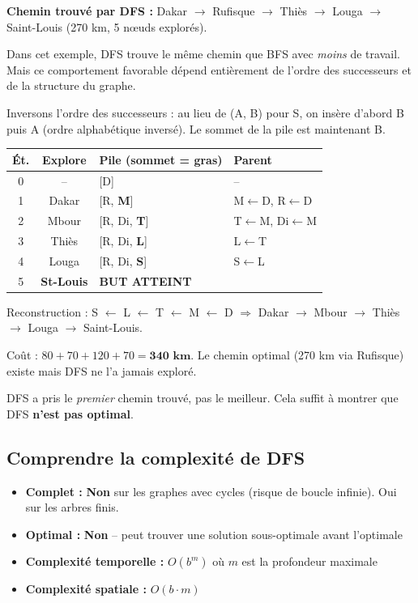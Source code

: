 \documentclass[11pt,a4paper]{article}
\begin{document}
\textbf{Chemin trouvé par DFS :} Dakar $\rightarrow$ Rufisque $\rightarrow$ Thiès $\rightarrow$ Louga $\rightarrow$ Saint-Louis (270 km, 5 nœuds explorés).

Dans cet exemple, DFS trouve le même chemin que BFS avec \textit{moins} de travail. Mais ce comportement favorable dépend entièrement de l'ordre des successeurs et de la structure du graphe.

\begin{exemplebox}
Inversons l'ordre des successeurs : au lieu de (A, B) pour S, on insère d'abord B puis A (ordre alphabétique inversé). Le sommet de la pile est maintenant B.

{\small
\begin{center}
\begin{tabular}{|c|c|l|l|}
\hline
\textbf{Ét.} & \textbf{Explore} & \textbf{Pile (sommet = gras)} & \textbf{Parent} \\
\hline
0 & -- & [D] & -- \\
1 & Dakar & [R, \textbf{M}] & M$\leftarrow$D, R$\leftarrow$D \\
2 & Mbour & [R, Di, \textbf{T}] & T$\leftarrow$M, Di$\leftarrow$M \\
3 & Thiès & [R, Di, \textbf{L}] & L$\leftarrow$T \\
4 & Louga & [R, Di, \textbf{S}] & S$\leftarrow$L \\
5 & \textbf{St-Louis} & \textbf{BUT ATTEINT} & \\
\hline
\end{tabular}
\end{center}
}

Reconstruction : S $\leftarrow$ L $\leftarrow$ T $\leftarrow$ M $\leftarrow$ D $\Rightarrow$ Dakar $\to$ Mbour $\to$ Thiès $\to$ Louga $\to$ Saint-Louis.

Coût : $80 + 70 + 120 + 70 = \textbf{340 km}$. Le chemin optimal (270 km via Rufisque) existe mais DFS ne l'a jamais exploré.

DFS a pris le \textit{premier} chemin trouvé, pas le meilleur. Cela suffit à montrer que DFS \textbf{n'est pas optimal}.
\end{exemplebox}

\subsection{Comprendre la complexité de DFS}

\begin{theorembox}
\begin{itemize}
    \item \textbf{Complet :} \textbf{Non} sur les graphes avec cycles (risque de boucle infinie). Oui sur les arbres finis.
    \item \textbf{Optimal :} \textbf{Non} -- peut trouver une solution sous-optimale avant l'optimale
    \item \textbf{Complexité temporelle :} $O(b^m)$ où $m$ est la profondeur maximale
    \item \textbf{Complexité spatiale :} $O(b \cdot m)$
\end{itemize}
\end{theorembox}
\end{document}
